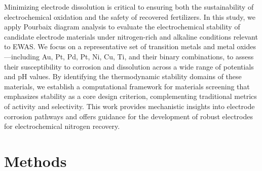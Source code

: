 \documentclass[journal=jacsat,manuscript=article]{achemso}
\begin{document}

Minimizing electrode dissolution is critical to ensuring both the sustainability of electrochemical oxidation and the safety of recovered fertilizers. In this study, we apply Pourbaix diagram analysis to evaluate the electrochemical stability of candidate electrode materials under nitrogen-rich and alkaline conditions relevant to EWAS. We focus on a representative set of transition metals and metal oxides—including Au, Pt, Pd, Pt, Ni, Cu, Ti, and their binary combinations, to assess their susceptibility to corrosion and dissolution across a wide range of potentials and pH values. By identifying the thermodynamic stability domains of these materials, we establish a computational framework for materials screening that emphasizes stability as a core design criterion, complementing traditional metrics of activity and selectivity. This work provides mechanistic insights into electrode corrosion pathways and offers guidance for the development of robust electrodes for electrochemical nitrogen recovery.



\section{Methods}
\end{document}
